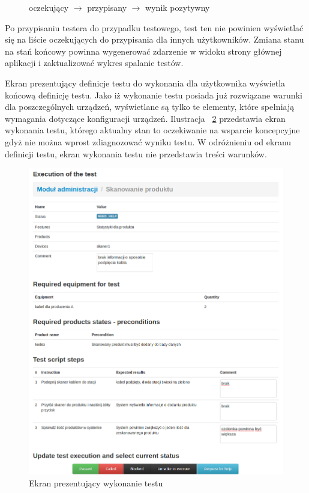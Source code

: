 \begin{figure}[h!]
  \begin{center}
   oczekujący $\rightarrow$  przypisany $\rightarrow$ wynik pozytywny 
  \end{center}
  \label{diag:przejscie}
\end{figure}

Po przypisaniu testera do przypadku testowego, test ten nie powinien wyświetlać się na liście oczekujących do przypisania dla innych użytkowników. Zmiana stanu na stań końcowy powinna wygenerować zdarzenie w widoku strony głównej aplikacji i zaktualizować wykres spalanie testów.

Ekran prezentujący definicje testu do wykonania dla użytkownika wyświetla końcową definicję testu. Jako iż wykonanie testu posiada już rozwiązane warunki dla poszczególnych urządzeń, wyświetlane są tylko te elementy, które spełniają wymagania dotyczące konfiguracji urządzeń. Ilustracja  ~\ref{fig:wykonanieTestu} przedstawia ekran wykonania testu, którego aktualny stan to oczekiwanie na wsparcie koncepcyjne gdyż nie można wprost zdiagnozować wyniku testu. W odróżnieniu od ekranu definicji testu, ekran wykonania testu nie przedstawia treści warunków.

 \begin{figure}[here]
  \begin{center}
    \includegraphics[scale=0.4]{img/screen/wykonanieTestu.png}
    
    \caption{Ekran prezentujący wykonanie testu}
    \label{fig:wykonanieTestu}
  \end{center}
\end{figure}





